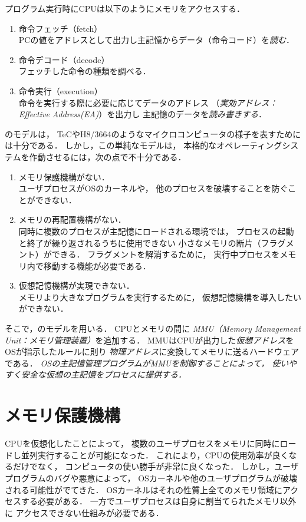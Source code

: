 プログラム実行時にCPUは以下のようにメモリをアクセスする．
\begin{enumerate}
\item 命令フェッチ（fetch）\\
  PCの値をアドレスとして出力し主記憶からデータ（命令コード）を\emph{読む}．
\item 命令デコード（decode） \\
  フェッチした命令の種類を調べる．
\item 命令実行（execution）\\
  命令を実行する際に必要に応じてデータのアドレス
  （\emph{実効アドレス：Effective Address(EA)}）を出力し
  主記憶のデータを\emph{読み書きする}．
\end{enumerate}

のモデルは，
TeCやH8/3664のようなマイクロコンピュータの様子を表すためには十分である．
しかし，この単純なモデルは，
本格的なオペレーティングシステムを作動させるには，次の点で不十分である．
\begin{enumerate}
\item メモリ保護機構がない．\\
  ユーザプロセスがOSのカーネルや，
  他のプロセスを破壊することを防ぐことができない．
\item メモリの再配置機構がない．\\
  同時に複数のプロセスが主記憶にロードされる環境では，
  プロセスの起動と終了が繰り返されるうちに使用できない
  小さなメモリの断片（フラグメント）ができる．
  フラグメントを解消するために，
  実行中プロセスをメモリ内で移動する機能が必要である．
\item 仮想記憶機構が実現できない．\\
  メモリより大きなプログラムを実行するために，
  仮想記憶機構を導入したいができない．
\end{enumerate}

そこで，のモデルを用いる．
CPUとメモリの間に
\emph{MMU（Memory Management Unit：メモリ管理装置）}を追加する．
MMUはCPUが出力した\emph{仮想アドレス}をOSが指示したルールに則り
\emph{物理アドレス}に変換してメモリに送るハードウェアである．
\emph{OSの主記憶管理プログラムがMMUを制御することによって，
  使いやすく安全な仮想の主記憶をプロセスに提供する．}

\section{メモリ保護機構}
CPUを仮想化したことによって，
複数のユーザプロセスをメモリに同時にロードし並列実行することが可能になった．
これにより，CPUの使用効率が良くなるだけでなく，
コンピュータの使い勝手が非常に良くなった．
しかし，ユーザプログラムのバグや悪意によって，
OSカーネルや他のユーザプログラムが破壊される可能性がでてきた．
OSカーネルはそれの性質上全てのメモリ領域にアクセスする必要がある．
一方でユーザプロセスは自身に割当てられたメモリ以外に
アクセスできない仕組みが必要である．

